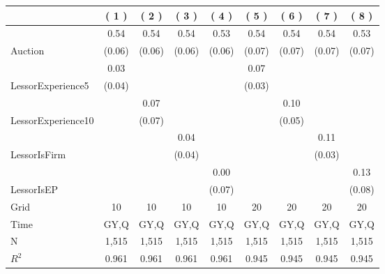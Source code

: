 
\begin{tabular}{lcccccccc}
\toprule
 & ( 1 ) & ( 2 ) & ( 3 ) & ( 4 ) & ( 5 ) & ( 6 ) & ( 7 ) & ( 8 )\\
\midrule
 & 0.54 & 0.54 & 0.54 & 0.53 & 0.54 & 0.54 & 0.54 & 0.53\\

\multirow{-2}{*}{\raggedright\arraybackslash Auction} & (0.06) & (0.06) & (0.06) & (0.06) & (0.07) & (0.07) & (0.07) & (0.07)\\

 & 0.03 & \phantom{X} & \phantom{X} & \phantom{X} & 0.07 & \phantom{X} & \phantom{X} & \phantom{X}\\

\multirow{-2}{*}{\raggedright\arraybackslash LessorExperience5} & (0.04) & \phantom{X} & \phantom{X} & \phantom{X} & (0.03) & \phantom{X} & \phantom{X} & \phantom{X}\\

 & \phantom{X} & 0.07 & \phantom{X} & \phantom{X} & \phantom{X} & 0.10 & \phantom{X} & \phantom{X}\\

\multirow{-2}{*}{\raggedright\arraybackslash LessorExperience10} & \phantom{X} & (0.07) & \phantom{X} & \phantom{X} & \phantom{X} & (0.05) & \phantom{X} & \phantom{X}\\

 & \phantom{X} & \phantom{X} & 0.04 & \phantom{X} & \phantom{X} & \phantom{X} & 0.11 & \phantom{X}\\

\multirow{-2}{*}{\raggedright\arraybackslash LessorIsFirm} & \phantom{X} & \phantom{X} & (0.04) & \phantom{X} & \phantom{X} & \phantom{X} & (0.03) & \phantom{X}\\

 & \phantom{X} & \phantom{X} & \phantom{X} & 0.00 & \phantom{X} & \phantom{X} & \phantom{X} & 0.13\\

\multirow{-2}{*}{\raggedright\arraybackslash LessorIsEP} & \phantom{X} & \phantom{X} & \phantom{X} & (0.07) & \phantom{X} & \phantom{X} & \phantom{X} & (0.08)\\

\midrule
Grid & 10 & 10 & 10 & 10 & 20 & 20 & 20 & 20\\

Time & GY,Q & GY,Q & GY,Q & GY,Q & GY,Q & GY,Q & GY,Q & GY,Q\\

N & 1,515 & 1,515 & 1,515 & 1,515 & 1,515 & 1,515 & 1,515 & 1,515\\

$R^2$ & 0.961 & 0.961 & 0.961 & 0.961 & 0.945 & 0.945 & 0.945 & 0.945\\
\bottomrule
\end{tabular}
